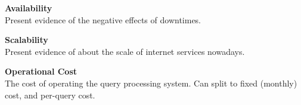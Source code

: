 
\textbf{Availability} \\
  Present evidence of the negative effects of downtimes.



\textbf{Scalability} \\
Present evidence of about the scale of internet services nowadays.

\textbf{Operational Cost} \\
The cost of operating the query processing system. Can split to fixed (monthly) cost, and per-query cost.


